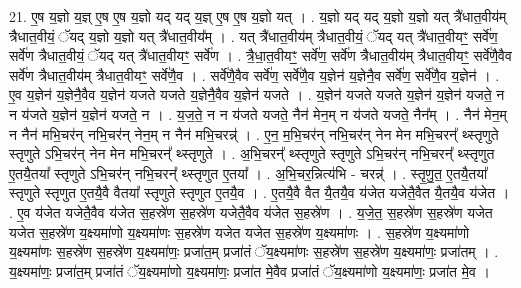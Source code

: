 \documentclass[17pt]{extarticle}
\begin{document}
21. ए॒ष य॒ज्ञो य॒ज्ञ् ए॒ष ए॒ष य॒ज्ञो यद् यद् य॒ज्ञ् ए॒ष ए॒ष य॒ज्ञो यत् । . य॒ज्ञो यद् यद् य॒ज्ञो य॒ज्ञो यत् त्रै॑धात॒वीय॑म् त्रैधात॒वीयं॒ ॅयद् य॒ज्ञो य॒ज्ञो यत् त्रै॑धात॒वीय᳚म् । . यत् त्रै॑धात॒वीय॑म् त्रैधात॒वीयं॒ ॅयद् यत् त्रै॑धात॒वीयꣳ॒॒ सर्वे॑ण॒ सर्वे॑ण त्रैधात॒वीयं॒ ॅयद् यत् त्रै॑धात॒वीयꣳ॒॒ सर्वे॑ण । . त्रै॒धा॒त॒वीयꣳ॒॒ सर्वे॑ण॒ सर्वे॑ण त्रैधात॒वीय॑म् त्रैधात॒वीयꣳ॒॒ सर्वे॑णै॒वैव सर्वे॑ण त्रैधात॒वीय॑म् त्रैधात॒वीयꣳ॒॒ सर्वे॑णै॒व । . सर्वे॑णै॒वैव सर्वे॑ण॒ सर्वे॑णै॒व य॒ज्ञेन॑ य॒ज्ञेनै॒व सर्वे॑ण॒ सर्वे॑णै॒व य॒ज्ञेन॑ । . ए॒व य॒ज्ञेन॑ य॒ज्ञेनै॒वैव य॒ज्ञेन॑ यजते यजते य॒ज्ञेनै॒वैव य॒ज्ञेन॑ यजते । . य॒ज्ञेन॑ यजते यजते य॒ज्ञेन॑ य॒ज्ञेन॑ यजते॒ न न य॑जते य॒ज्ञेन॑ य॒ज्ञेन॑ यजते॒ न । . य॒ज॒ते॒ न न य॑जते यजते॒ नैन॑ मेन॒म् न य॑जते यजते॒ नैन᳚म् । . नैन॑ मेन॒म् न नैन॑ मभि॒चर॑न् नभि॒चर॑न् नेन॒म् न नैन॑ मभि॒चरन्न्॑ । . ए॒न॒ म॒भि॒चर॑न् नभि॒चर॑न् नेन मेन मभि॒चरन्᳚ थ्स्तृणुते स्तृणुते ऽभि॒चर॑न् नेन मेन मभि॒चरन्᳚ थ्स्तृणुते । . अ॒भि॒चरन्᳚ थ्स्तृणुते स्तृणुते ऽभि॒चर॑न् नभि॒चरन्᳚ थ्स्तृणुत ए॒तयै॒तया᳚ स्तृणुते ऽभि॒चर॑न् नभि॒चरन्᳚ थ्स्तृणुत ए॒तया᳚ । . अ॒भि॒चर॒न्नित्य॑भि - चरन्न्॑ । . स्तृ॒णु॒त॒ ए॒तयै॒तया᳚ स्तृणुते स्तृणुत ए॒तयै॒वै वैतया᳚ स्तृणुते स्तृणुत ए॒तयै॒व । . ए॒तयै॒वै वैत यै॒तयै॒व य॑जेत यजेतै॒वैत यै॒तयै॒व य॑जेत । . ए॒व य॑जेत यजेतै॒वैव य॑जेत स॒हस्रे॑ण स॒हस्रे॑ण यजेतै॒वैव य॑जेत स॒हस्रे॑ण । . य॒जे॒त॒ स॒हस्रे॑ण स॒हस्रे॑ण यजेत यजेत स॒हस्रे॑ण य॒क्ष्यमा॑णो य॒क्ष्यमा॑णः स॒हस्रे॑ण यजेत यजेत स॒हस्रे॑ण य॒क्ष्यमा॑णः । . स॒हस्रे॑ण य॒क्ष्यमा॑णो य॒क्ष्यमा॑णः स॒हस्रे॑ण स॒हस्रे॑ण य॒क्ष्यमा॑णः॒ प्रजा॑त॒म् प्रजा॑तं ॅय॒क्ष्यमा॑णः स॒हस्रे॑ण स॒हस्रे॑ण य॒क्ष्यमा॑णः॒ प्रजा॑तम् । . य॒क्ष्यमा॑णः॒ प्रजा॑त॒म् प्रजा॑तं ॅय॒क्ष्यमा॑णो य॒क्ष्यमा॑णः॒ प्रजा॑त मे॒वैव प्रजा॑तं ॅय॒क्ष्यमा॑णो य॒क्ष्यमा॑णः॒ प्रजा॑त मे॒व । \newline
\end{document}
